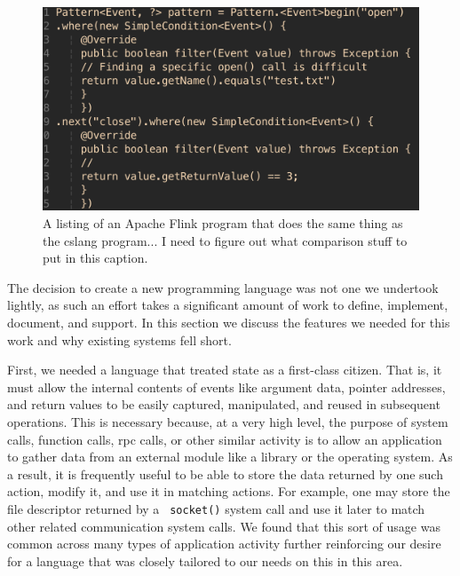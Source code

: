 \begin{figure}
  \includegraphics[scale=.50, frame]{images/flinklisting}
  \caption{A listing of an Apache Flink program that does the same thing as the
  cslang program... I need to figure out what comparison stuff to put in
  this caption.}
  \label{fig:flinklisting}
\end{figure}


The decision to create a new programming language was not one we
undertook lightly,
as such an effort takes
a significant amount of work
to define,
implement, document, and support.
In this section we discuss the features we needed for this work
and why existing systems fell short.

First, we needed a language that treated state as a first-class citizen.
That is, it must allow the internal contents of events like argument data,
pointer addresses, and return values to be easily captured, manipulated, and
reused in subsequent operations.
This is necessary because,
at a very high level,
the purpose of system calls,
function calls,
rpc calls,
or other similar activity
is to allow an application
to gather data from an external module like a library or the operating
system.
As a result, it is frequently useful to be able to store the data returned by
one such action, modify it, and use it in matching actions.
For example, one may store the file descriptor returned by a {\tt
socket()} system call and use it later to match other related
communication system calls.
We found that this sort of usage was common across many types of
application activity further reinforcing our desire for a language that was
closely tailored to our needs on this in this area.




